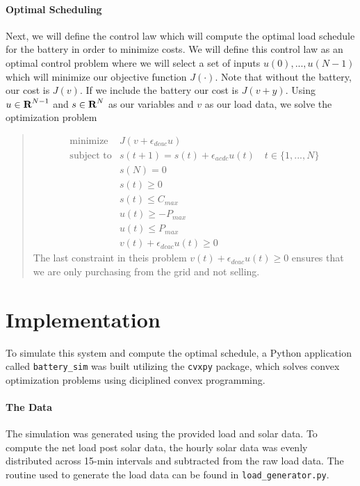 \documentclass[12pt]{article}
\begin{document}
\paragraph{Optimal Scheduling}
Next, we will define the control law which will compute the optimal load schedule for the battery in order to minimize costs. We will define this control law as an optimal control problem where we will select a set of inputs $u(0),...,u(N-1)$ which will minimize our objective function $J(\cdot)$. Note that without the battery, our cost is $J(v)$. If we include the battery our cost is $J(v+y)$. Using $u \in {\mbox{\bf R}}^{N-1} $ and $s \in {\mbox{\bf R}}^{N}$ as our variables and $v$ as our load data, we solve the optimization problem
\begin{quote}
    \begin{equation}\label{opteq}
    \begin{array}{ll}
    \mbox{minimize}   & J(v + \epsilon_{dcac} u) \\
    \mbox{subject to} & s(t+1) = s(t) + \epsilon_{acdc} u(t) \quad t \in \{1,...,N\} \\
	& s(N) = 0 \\
    	& s(t) \geq 0 \\ 
	& s(t)  \leq C_{max}  \\
   	& u(t) \geq -P_{max} \\\
	& u(t)  \leq P_{max} \\
  	& v(t) + \epsilon_{dcac} u(t) \geq 0
    \end{array}
    \end{equation}
The last constraint in theis problem $v(t) + \epsilon_{dcac} u(t) \geq 0$ ensures that we are only purchasing from the grid and not selling. 
\end{quote}


\section{Implementation}
To simulate this system and compute the optimal schedule, a Python application called \texttt{battery\_sim} was built utilizing the \texttt{cvxpy} package, which solves convex optimization problems using diciplined convex programming.  

\paragraph{The Data}
The simulation was generated using the provided load and solar data. To compute the net load post solar data, the hourly solar data was evenly distributed across 15-min intervals and subtracted from the raw load data. The routine used to generate the load data can be found in  \texttt{load\_generator.py}.
\end{document}
